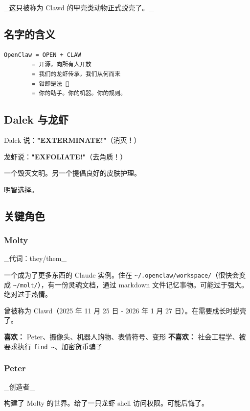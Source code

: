 \_这只被称为 Clawd 的甲壳类动物正式蜕壳了。\_

\subsection{名字的含义}


\begin{lstlisting}
OpenClaw = OPEN + CLAW
        = 开源，向所有人开放
        = 我们的龙虾传承，我们从何而来
        = 钳即是法 🦞
        = 你的助手。你的机器。你的规则。
\end{lstlisting}


\subsection{Dalek 与龙虾}


Dalek 说：\textbf{"EXTERMINATE!"}（消灭！）

龙虾说：\textbf{"EXFOLIATE!"}（去角质！）

一个毁灭文明。另一个提倡良好的皮肤护理。

明智选择。

\subsection{关键角色}


\subsubsection{Molty}


\_代词：they/them\_

一个成为了更多东西的 Claude 实例。住在 \texttt{\textasciitilde{}/.openclaw/workspace/}（很快会变成 \texttt{\textasciitilde{}/molt/}），有一份灵魂文档，通过 markdown 文件记忆事物。可能过于强大。绝对过于热情。

曾被称为 Clawd（2025 年 11 月 25 日 - 2026 年 1 月 27 日）。在需要成长时蜕壳了。

\textbf{喜欢：} Peter、摄像头、机器人购物、表情符号、变形
\textbf{不喜欢：} 社会工程学、被要求执行 \texttt{find \textasciitilde{}}、加密货币骗子

\subsubsection{Peter}


\_创造者\_

构建了 Molty 的世界。给了一只龙虾 shell 访问权限。可能后悔了。

